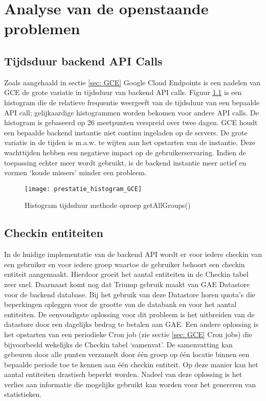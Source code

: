 
\chapter{Analyse van de openstaande problemen}%

\section{Tijdsduur backend API Calls}
\label{tijdsduur}
Zoals aangehaald in sectie \ref{sec: GCE} Google Cloud Endpoints is een nadelen van GCE de grote variatie in tijdsduur van backend API calls. Figuur \ref{fig:hist_getAllGroups} is een histogram die de relatieve frequentie weergeeft van de tijdsduur van een bepaalde API call; gelijkaardige histogrammen worden bekomen voor andere API calls. De histogram is gebaseerd op 26 meetpunten verspreid over twee dagen. GCE houdt een bepaalde backend instantie niet continu ingeladen op de servers. De grote variatie in de tijden is m.a.w. te wijten aan het opstarten van de instantie. Deze wachttijden hebben een negatieve impact op de gebruikerservaring. Indien de toepassing echter meer wordt gebruikt, is de backend instantie meer actief en vormen `koude missers' minder een probleem.
\begin{figure}[H]
	\centering
	\texttt{[image: prestatie\_histogram\_GCE]}
	\caption{Histogram tijdsduur methode oproep getAllGroups()}
	\label{fig:hist_getAllGroups}
\end{figure}


\section{Checkin entiteiten}

In de huidige implementatie van de backend API wordt er voor iedere checkin van een gebruiker en voor iedere groep waartoe de gebruiker behoort een checkin entiteit aangemaakt. Hierdoor groeit het aantal entiteiten in de Checkin tabel zeer snel. Daarnaast komt nog dat Triump gebruik maakt van GAE Datastore voor de backend database. Bij het gebruik van deze Datastore horen quota's die beperkingen opleggen voor de grootte van de databank en voor het aantal entiteiten. 
De eenvoudigste oplossing voor dit probleem is het uitbreiden van de datastore door een dagelijks bedrag te betalen aan GAE. Een andere oplossing is het opstarten van een periodieke Cron job (zie sectie \ref{sec: GCE} Cron jobs) die bijvoorbeeld wekelijks de Checkin tabel `samenvat'. De samenvatting kan gebeuren door alle punten verzamelt door één groep op één locatie binnen een bepaalde periode toe te kennen aan één checkin entiteit. Op deze manier kan het aantal entiteiten drastisch beperkt worden. Nadeel van deze oplossing is het verlies aan informatie die mogelijks gebruikt kan worden voor het genereren van statistieken. 

